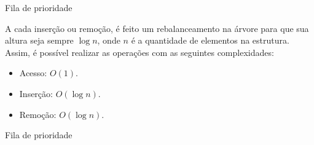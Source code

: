 \begin{frame}{Fila de prioridade}

    A cada inserção ou remoção, é feito um rebalanceamento na árvore para que sua altura seja sempre $\log n$, onde $n$ é a quantidade de elementos na estrutura. Assim, é possível realizar as operações com as seguintes complexidades:

    \begin{itemize}
        \item Acesso: $O(1)$.
        \item Inserção: $O(\log n)$.
        \item Remoção: $O(\log n)$.
    \end{itemize}

    \begin{block}{Fila de prioridade}
        \footnotesize
        \inputminted{cpp}{codigos/fila-prioridade.cpp}    
    \end{block}
    
\end{frame}

